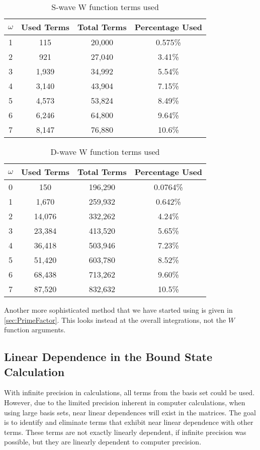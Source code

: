 \documentclass[Dissertation.tex]{subfiles}
\begin{document}
\begin{table}[H]
\centering
\begin{tabular}{c c c c}
\toprule
$\omega$ & Used Terms & Total Terms & Percentage Used \\
\midrule
1 & 	115   &  20,000 & 	0.575\% \\
2 & 	921   &  27,040 & 	3.41\% \\
3 & 	1,939 &  34,992 & 	5.54\% \\
4 & 	3,140 &  43,904 & 	7.15\% \\
5 & 	4,573 &  53,824 &	8.49\% \\
6 & 	6,246 &  64,800 &	9.64\% \\
7 & 	8,147 &  76,880 &	10.6\% \\
\bottomrule
\end{tabular}
\caption{S-wave W function terms used}
\label{tab:WFuncUnusedS}
\end{table}

\begin{table}[H]
\centering
\begin{tabular}{c c c c}
\toprule
$\omega$ & Used Terms & Total Terms & Percentage Used \\
\midrule
0 & 150		&	196,290 &	0.0764\% \\
1 & 1,670	&	259,932 &	0.642\% \\
2 & 14,076	&	332,262 &	4.24\% \\
3 & 23,384	&	413,520 &	5.65\% \\
4 & 36,418	&	503,946 &	7.23\% \\
5 & 51,420  &	603,780 &	8.52\% \\
6 & 68,438	&	713,262 &	9.60\% \\
7 & 87,520	&	832,632 &  10.5\% \\
\bottomrule
\end{tabular}
\caption{D-wave W function terms used}
\label{tab:WFuncUnusedD}
\end{table}

Another more sophisticated method that we have started using is given in
\cref{sec:PrimeFactor}. This looks instead at the overall integrations,
not the $W$ function arguments.



\subsection{Linear Dependence in the Bound State Calculation}
With infinite precision in calculations, all terms from the basis set could be used. However, due to the limited precision inherent in computer calculations, when using large basis sets, near linear dependences will exist in the matrices. The goal is to identify and eliminate terms that exhibit near linear dependence with other terms. These terms are not exactly linearly dependent, if infinite precision was possible, but they are linearly dependent to computer precision.
\end{document}
